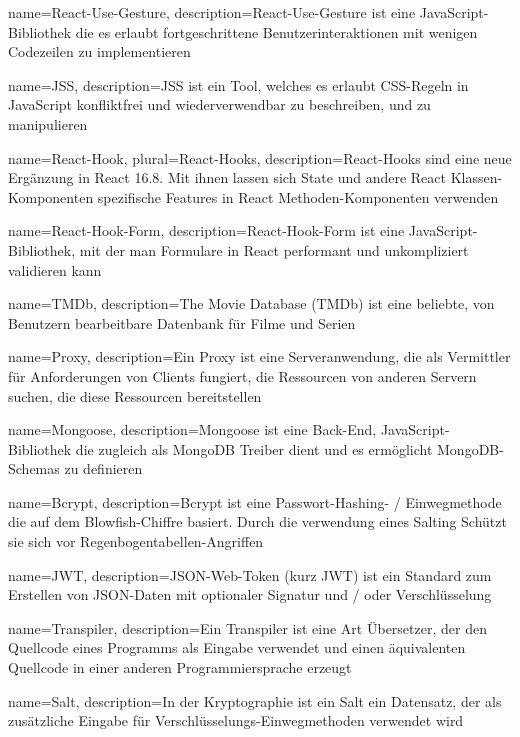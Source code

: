 {   name={React-Use-Gesture},
    description={React-Use-Gesture ist eine JavaScript-Bibliothek die es erlaubt fortgeschrittene Benutzerinteraktionen mit wenigen Codezeilen zu implementieren}
}

{   name={JSS},
    description={JSS ist ein Tool, welches es erlaubt CSS-Regeln in JavaScript konfliktfrei und wiederverwendbar zu beschreiben, und zu manipulieren}
}

{   name={React-Hook},
    plural={React-Hooks},
    description={React-Hooks sind eine neue Ergänzung in React 16.8. Mit ihnen lassen sich State und andere React Klassen-Komponenten spezifische Features in React Methoden-Komponenten verwenden}
}

{   name={React-Hook-Form},
    description={React-Hook-Form ist eine JavaScript-Bibliothek, mit der man Formulare in React performant und unkompliziert validieren kann}
}

{   name={TMDb},
    description={The Movie Database (TMDb) ist eine beliebte, von Benutzern bearbeitbare Datenbank für Filme und Serien}
}

{   name={Proxy},
    description={Ein Proxy ist eine Serveranwendung, die als Vermittler für Anforderungen von Clients fungiert, die Ressourcen von anderen Servern suchen, die diese Ressourcen bereitstellen}
}

{   name={Mongoose},
    description={Mongoose ist eine Back-End, JavaScript-Bibliothek die zugleich als MongoDB Treiber dient und es ermöglicht MongoDB-Schemas zu definieren}
}

{   name={Bcrypt},
    description={Bcrypt ist eine Passwort-Hashing- / Einwegmethode die auf dem Blowfish-Chiffre basiert. Durch die verwendung eines Salting Schützt sie sich vor Regenbogentabellen-Angriffen}
}

{   name={JWT},
    description={JSON-Web-Token (kurz JWT) ist ein Standard zum Erstellen von JSON-Daten mit optionaler Signatur und / oder Verschlüsselung}
}

{   name={Transpiler},
    description={Ein Transpiler ist eine Art Übersetzer, der den Quellcode eines Programms als Eingabe verwendet und einen äquivalenten Quellcode in einer anderen Programmiersprache erzeugt}
}

{   name={Salt},
    description={In der Kryptographie ist ein Salt ein Datensatz, der als zusätzliche Eingabe für Verschlüsselungs-Einwegmethoden verwendet wird}
}

